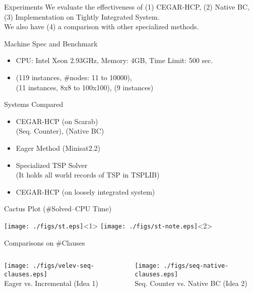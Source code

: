 \documentclass{beamer}
\begin{document}
\begin{frame}{Experiments}
We evaluate the effectiveness of (1) CEGAR-HCP, (2) Native BC, \\
(3) Implementation on Tightly Integrated System. \\
We also have (4) a comparison with other specialized methods. 

\begin{block}{Machine Spec and Benchmark}
\begin{itemize}
\item CPU: Intel Xeon 2.93GHz, Memory: 4GB, Time Limit: 500 sec.
\item {} (119 instances, $\#$nodes: 11 to 10000), \\ (11 instances, 8x8 to 100x100),  (9 instances)
\end{itemize}
\end{block}

\begin{block}{Systems Compared}
  \begin{itemize}[<+->]
\item CEGAR-HCP (on \textsf{Scarab})\\  (Seq. Counter),  (Native BC)
  \item Eager Method  (Minisat2.2)
\item Specialized TSP Solver \\ 
  (It holds all world records of TSP in TSPLIB)
\item CEGAR-HCP (on loosely integrated system) 
  \end{itemize}
\end{block}
\end{frame}

\begin{frame}{Cactus Plot (\#Solved--CPU Time)}
\begin{center}
  \texttt{[image: ./figs/st.eps]}<1>
  \texttt{[image: ./figs/st-note.eps]}<2>
\end{center}
\end{frame}

\begin{frame}{Comparisons on \#Clauses}
\begin{columns}
\begin{column}{0.5\textwidth}
\centering
\texttt{[image: ./figs/velev-seq-clauses.eps]}\\
\scriptsize
Eager vs. Incremental (Idea 1)
\end{column}
\begin{column}{0.5\textwidth}
\centering
\texttt{[image: ./figs/seq-native-clauses.eps]}\\
\scriptsize
Seq. Counter vs. Native BC (Idea 2)
\end{column}
\end{columns}
\end{frame}
\end{document}
